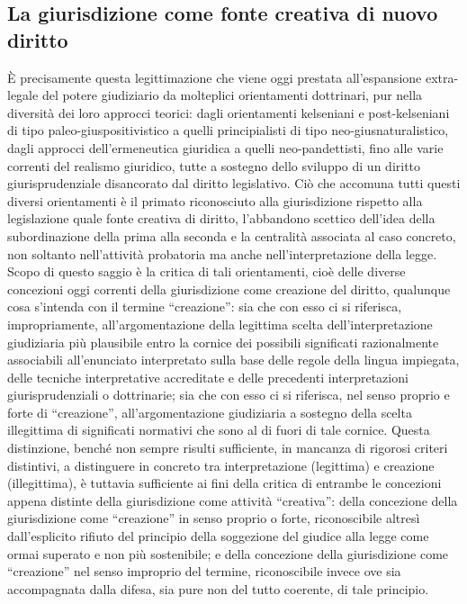 \subsection{La giurisdizione come fonte creativa di nuovo diritto}
È precisamente questa legittimazione che viene oggi prestata all’espansione extra-legale del potere giudiziario da molteplici orientamenti dottrinari, pur nella diversità dei loro approcci teorici: dagli orientamenti kelseniani e post-kelseniani di tipo paleo-giuspositivistico a quelli principialisti di tipo neo-giusnaturalistico, dagli approcci dell’ermeneutica giuridica a quelli neo-pandettisti, fino alle varie correnti del realismo giuridico, tutte a sostegno dello sviluppo di un diritto giurisprudenziale disancorato dal diritto legislativo. Ciò che accomuna tutti questi diversi orientamenti è il primato riconosciuto alla giurisdizione rispetto alla legislazione quale fonte creativa di diritto, l’abbandono scettico dell’idea della subordinazione della prima alla seconda e la centralità associata al caso concreto, non soltanto nell’attività probatoria ma anche nell’interpretazione della legge.
Scopo di questo saggio è la critica di tali orientamenti, cioè delle diverse concezioni oggi correnti della giurisdizione come creazione del diritto, qualunque cosa s’intenda con il termine “creazione”: sia che con esso ci si riferisca, impropriamente, all’argomentazione della legittima scelta dell’interpretazione giudiziaria più plausibile entro la cornice dei possibili significati razionalmente associabili all’enunciato interpretato sulla base delle regole della lingua impiegata, delle tecniche interpretative accreditate e delle precedenti interpretazioni giurisprudenziali o dottrinarie; sia che con esso ci si riferisca, nel senso proprio e forte di “creazione”, all’argomentazione giudiziaria a sostegno della scelta illegittima di significati normativi che sono al di fuori di tale cornice. Questa distinzione, benché non sempre risulti sufficiente, in mancanza di rigorosi criteri distintivi, a distinguere in concreto tra interpretazione (legittima) e creazione (illegittima), è tuttavia sufficiente ai fini della critica di entrambe le concezioni appena distinte della giurisdizione come attività “creativa”: della concezione della giurisdizione come “creazione” in senso proprio o forte, riconoscibile altresì dall’esplicito rifiuto del principio della soggezione del giudice alla legge come ormai superato e non più sostenibile; e della concezione della giurisdizione come “creazione” nel senso improprio del termine, riconoscibile invece ove sia accompagnata dalla difesa, sia pure non del tutto coerente, di tale principio.
